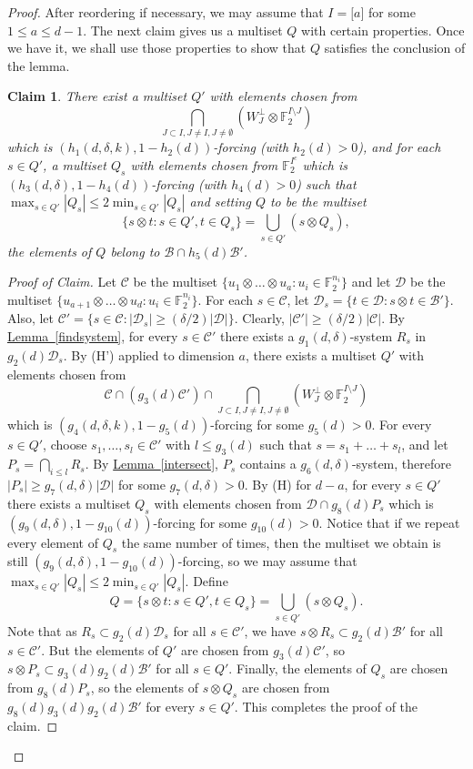 \documentclass[11pt]{article}
\numberwithin{equation}{section}
\theoremstyle{definition}
\theoremstyle{plain}
\newcommand{\expref}[2]{\hyperref[#2]{#1~\ref{#2}}}
\newcommand\F{\mathbb{F}}
\renewcommand\d{\delta}
\newcommand \cB{\mathcal B}
\newcommand \cC{\mathcal C}
\newcommand \cD{\mathcal D}
\newcommand \s{\subset}
\newtheorem*{claim*}{Claim}
\begin{document}
\begin{proof}
  After reordering if necessary, we may assume that $I=\lbrack a\rbrack$ for some $1\leq a \leq d-1$. The next claim gives us a multiset $Q$ with certain properties. Once we have it, we shall use those properties to show that $Q$ satisfies the conclusion of the lemma.
  
  \begin{claim*} There exist a multiset $Q'$ with elements chosen
    from
    \[
      \bigcap_{J\subset I,J\neq I,J\neq
        \emptyset}(W_J^{\perp}\otimes \F_2^{I \setminus J})
    \]
    which is $(h_1(d,\d,k),1-h_2(d))$-forcing (with $h_2(d)>0$), and
    for each $s\in Q'$, a multiset $Q_s$ with elements chosen from
    $\F_2^{I^c}$ which is $(h_3(d,\d),1-h_4(d))$-forcing (with
    $h_4(d)>0$) such that
    $\max_{s\in Q'}|Q_s|\leq 2\min_{s\in Q'}|Q_s|$ and setting $Q$ to
    be the multiset
    \[
      \{s\otimes t: s\in Q',t\in Q_s\}=\bigcup_{s\in Q'}(s\otimes Q_s),
    \]
    the elements of $Q$ belong to $\cB\cap h_5(d)\cB'$.
  \end{claim*}
  
  \begin{proof}[Proof of Claim] Let $\cC$ be the multiset
    $\{u_1\otimes \dots \otimes u_a: u_i\in \F_2^{n_i}\}$ and let
    $\cD$ be the multiset
    $\{u_{a+1}\otimes \dots \otimes u_d: u_i\in \F_2^{n_i}\}$. For
    each $s\in \cC$, let $\cD_s=\{t\in \cD: s\otimes t\in
    \cB'\}$. Also, let
    $\cC'=\{s\in \cC: |\cD_s|\geq ({\d}/{2})|\cD|\}$. Clearly,
    $|\cC'|\geq ({\d}/{2}) |\cC|$. By \expref{Lemma}{findsystem}, for
    every $s\in \cC'$ there exists a $g_1(d,\d)$-system $R_s$ in
    $g_2(d)\cD_s$. By (H') applied to dimension $a$, there exists a
    multiset $Q'$ with elements chosen from
    \[
      \cC\cap (g_3(d)\cC')\cap \bigcap_{J\subset I,J\neq I,J\neq \emptyset}(W_J^{\perp}\otimes \F_2^{I \setminus J})
    \]
    which is $(g_4(d,\d,k),1-g_5(d))$-forcing for some $g_5(d)>0$. For
    every $s\in Q'$, choose $s_1,\dots,s_l\in \cC'$ with
    $l\leq g_3(d)$ such that $s=s_1+\dots+s_l$, and let
    $P_s=\bigcap_{i\leq l}R_s$. By \expref{Lemma}{intersect}, $P_s$
    contains a $g_6(d,\d)$-system, therefore
    $|P_s|\geq g_7(d,\d)|\cD|$ for some $g_7(d,\d)>0$. By (H) for
    $d-a$, for every $s\in Q'$ there exists a multiset $Q_s$ with
    elements chosen from $\cD\cap g_8(d)P_s$ which is
    $(g_9(d,\d),1-g_{10}(d))$-forcing for some $g_{10}(d)>0$. Notice
    that if we repeat every element of $Q_s$ the same number of times,
    then the multiset we obtain is still
    $(g_9(d,\d),1-g_{10}(d))$-forcing, so we may assume that
    $\max_{s\in Q'}|Q_s|\leq 2\min_{s\in Q'}|Q_s|$. Define
    \[
      Q=\{s\otimes t:s\in Q',t\in Q_s\}=\bigcup_{s\in Q'}(s\otimes
      Q_s).
    \]
    Note that as $R_s\subset g_2(d)\cD_s$ for all $s\in \cC'$, we have
    $s\otimes R_s\subset g_2(d)\cB'$ for all $s\in \cC'$. But the
    elements of $Q'$ are chosen from $g_3(d)\cC'$, so
    $s\otimes P_s\s g_3(d)g_2(d)\cB'$ for all $s\in Q'$. Finally, the
    elements of $Q_s$ are chosen from $g_8(d)P_s$, so the elements of
    $s\otimes Q_s$ are chosen from $g_8(d)g_3(d)g_2(d)\cB'$ for every
    $s\in Q'$. This completes the proof of the claim.
  \end{proof}
  

\end{proof}
\end{document}
